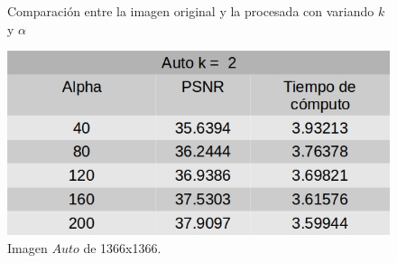 \documentclass[a4paper]{article}
\begin{document}
\begin{figure}[H]
\centering
{}
\caption{Comparación entre la imagen original y la procesada con variando $k$ y $\alpha$}
\end{figure}    
    
    \begin{figure}[H]
    \centering
    \includegraphics[scale=0.4]{imagenes/auto2.jpg}
    \caption{Imagen $Auto$ de 1366x1366.}
	\label{autoe}
    \end{figure}
\end{document}
